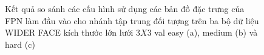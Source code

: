 {    \begin{figure}[H]
        \centering
        \caption{Kết quả so sánh các cấu hình sử dụng các bản đồ đặc trưng của FPN làm đầu vào cho nhánh tập trung đối tượng trên ba bộ dữ liệu WIDER FACE kích thước lớn lưới $3 X 3$ val easy (a), medium (b) và hard (c)}
        \label{fig:retinafocus_widerface_3k_val_fpn}
    \end{figure}

}
